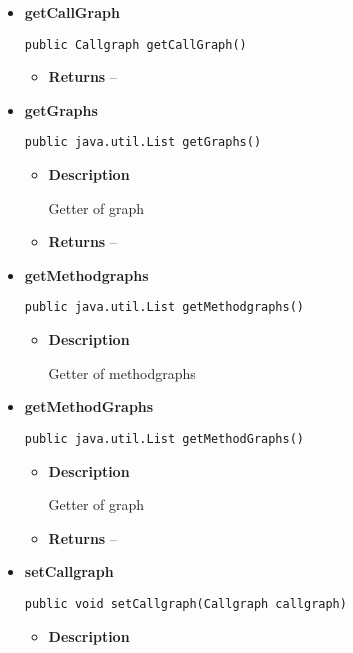 {{{{{{{{{{\begin{itemize}
{\begin{itemize}
{Getter of callgraph
}
\end{itemize}
}%
\item{ 
{\bf  getCallGraph}\\
\begin{lstlisting}[frame=none]
public Callgraph getCallGraph()\end{lstlisting} %
\begin{itemize}
\item{{\bf  Returns} -- 
 
}%
\end{itemize}
}%
\item{ 
{\bf  getGraphs}\\
\begin{lstlisting}[frame=none]
public java.util.List getGraphs()\end{lstlisting} %
\begin{itemize}
\item{
{\bf  Description}

Getter of graph
}
\item{{\bf  Returns} -- 
 
}%
\end{itemize}
}%
\item{ 
{\bf  getMethodgraphs}\\
\begin{lstlisting}[frame=none]
public java.util.List getMethodgraphs()\end{lstlisting} %
\begin{itemize}
\item{
{\bf  Description}

Getter of methodgraphs
}
\end{itemize}
}%
\item{ 
{\bf  getMethodGraphs}\\
\begin{lstlisting}[frame=none]
public java.util.List getMethodGraphs()\end{lstlisting} %
\begin{itemize}
\item{
{\bf  Description}

Getter of graph
}
\item{{\bf  Returns} -- 
 
}%
\end{itemize}
}%
\item{ 
{\bf  setCallgraph}\\
\begin{lstlisting}[frame=none]
public void setCallgraph(Callgraph callgraph)\end{lstlisting} %
\begin{itemize}
\item{
{\bf  Description}

}
\end{itemize}}
\end{itemize}}}}}}}}}}}
